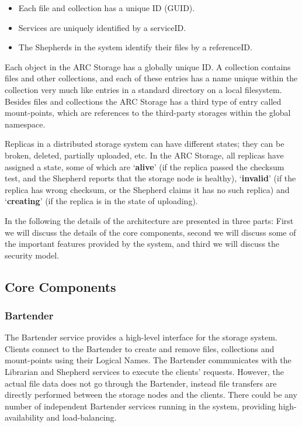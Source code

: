 \documentclass[final]{ieee}
\begin{document}
\begin{itemize} 
\item Each  file and collection has a unique ID (GUID).
\item Services are uniquely identified by a serviceID. 
\item The Shepherds in the system identify their files by a referenceID.
\end{itemize} 

Each object in the ARC Storage has a globally
unique ID. A collection contains files and other collections,
and each of these entries has a name unique within the collection very
much like entries in a standard directory on a local filesystem. Besides
files and collections the ARC Storage has a third type of entry
called mount-points, which are references to the third-party storages
within the global namespace.

Replicas in a distributed storage system can have different states;
they can be broken, deleted, partially uploaded, etc. In the
ARC Storage, all replicas have assigned a state, some of which are
`\textbf{alive}' (if the replica passed the checksum test, and the
Shepherd reports that the storage node is healthy), `\textbf{invalid}'
(if the replica has wrong checksum, or the Shepherd claims it has no
such replica) and `\textbf{creating}' (if the replica is in
the state of uploading).

In the following the details of the
architecture are presented in three parts: First we will discuss the
details of the core components, second we will discuss some of the
important features provided by the system, and third we will discuss the security model.

\subsection{Core Components} 
\subsubsection{Bartender}
\label{Bartender}
The Bartender service provides a high-level interface for the storage
system. Clients connect to the Bartender to create and remove
files, collections and mount-points using their Logical Names. The
Bartender communicates 
with the Librarian and Shepherd services to execute the clients'
requests. However, the actual file data does not go through the
Bartender, instead file
transfers are directly performed between the storage nodes and the
clients. There could be any number of independent Bartender services
running in the system, providing high-availability and
load-balancing. 
\end{document}
